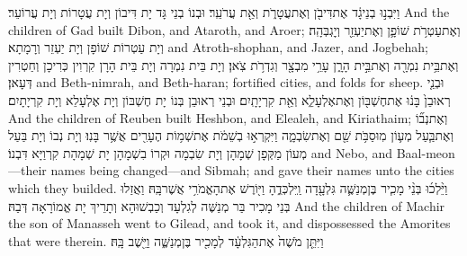 {וַיִּבְנ֣וּ בְנֵי\maqqaf גָ֔ד אֶת\maqqaf דִּיבֹ֖ן וְאֶת\maqqaf עֲטָרֹ֑ת וְאֵ֖ת עֲרֹעֵֽר׃}
{וּבְנוֹ בְנֵי גָּד יָת דִּיבוֹן וְיָת עֲטָרוֹת וְיָת עֲרוֹעֵר׃}
{And the children of Gad built Dibon, and Ataroth, and Aroer;}{}
{וְאֶת\maqqaf עַטְרֹ֥ת שׁוֹפָ֛ן וְאֶת\maqqaf יַעְזֵ֖ר וְיׇגְבְּהָֽה׃}
{וְיָת עַטְרוֹת שׁוֹפָן וְיָת יַעְזֵר וְרָמָתָא׃}
{and Atroth-shophan, and Jazer, and Jogbehah;}{}
{וְאֶת\maqqaf בֵּ֥ית נִמְרָ֖ה וְאֶת\maqqaf בֵּ֣ית הָרָ֑ן עָרֵ֥י מִבְצָ֖ר וְגִדְרֹ֥ת צֹֽאן׃}
{וְיָת בֵּית נִמְרָה וְיָת בֵּית הָרָן קִרְוִין כְּרִיכָן וְחַטְרִין דְּעָאן׃}
{and Beth-nimrah, and Beth-haran; fortified cities, and folds for sheep.}{}
{וּבְנֵ֤י רְאוּבֵן֙ בָּנ֔וּ אֶת\maqqaf חֶשְׁבּ֖וֹן וְאֶת\maqqaf אֶלְעָלֵ֑א וְאֵ֖ת קִרְיָתָֽיִם׃}
{וּבְנֵי רְאוּבֵן בְּנוֹ יָת חֶשְׁבּוֹן וְיָת אֶלְעָלֵא וְיָת קִרְיָתָיִם׃}
{And the children of Reuben built Heshbon, and Elealeh, and Kiriathaim;}{}
{וְאֶת\maqqaf נְב֞וֹ וְאֶת\maqqaf בַּ֧עַל מְע֛וֹן מֽוּסַבֹּ֥ת שֵׁ֖ם וְאֶת\maqqaf שִׂבְמָ֑ה וַיִּקְרְא֣וּ בְשֵׁמֹ֔ת אֶת\maqqaf שְׁמ֥וֹת הֶעָרִ֖ים אֲשֶׁ֥ר בָּנֽוּ׃}
{וְיָת נְבוֹ וְיָת בַּעַל מְעוֹן מַקְּפָן שְׁמָהָן וְיָת שִׂבְמָה וּקְרוֹ בִשְׁמָהָן יָת שְׁמָהָת קִרְוַיָּא דִּבְנוֹ׃}
{and Nebo, and Baal-meon—their names being changed—and Sibmah; and gave their names unto the cities which they builded.}{}
{וַיֵּ֨לְכ֜וּ בְּנֵ֨י מָכִ֧יר בֶּן\maqqaf מְנַשֶּׁ֛ה גִּלְעָ֖דָה וַֽיִּלְכְּדֻ֑הָ וַיּ֖וֹרֶשׁ אֶת\maqqaf הָאֱמֹרִ֥י אֲשֶׁר\maqqaf בָּֽהּ׃}
{וַאֲזַלוּ בְּנֵי מָכִיר בַּר מְנַשֶּׁה לְגִלְעָד וְכַבְשׁוּהָא וְתָרֵיךְ יָת אֱמוֹרָאָה דְּבַהּ׃}
{And the children of Machir the son of Manasseh went to Gilead, and took it, and dispossessed the Amorites that were therein.}{}
{וַיִּתֵּ֤ן מֹשֶׁה֙ אֶת\maqqaf הַגִּלְעָ֔ד לְמָכִ֖יר בֶּן\maqqaf מְנַשֶּׁ֑ה וַיֵּ֖שֶׁב בָּֽהּ׃}
